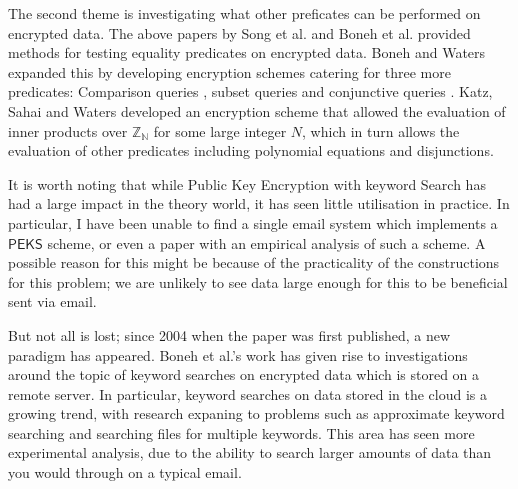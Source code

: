 \documentclass[a4paper,11pt]{article}
\begin{document}
    The second theme is investigating what other preficates can be performed on encrypted data. The above papers by Song et al. and Boneh et al. provided methods for testing equality predicates on encrypted data. Boneh and Waters\cite{boneh:predicate} expanded this by developing encryption schemes catering for three more predicates: Comparison queries , subset queries and conjunctive queries . Katz, Sahai and Waters\cite{katz:predicate} developed an encryption scheme that allowed the evaluation of inner products over $\mathbb{Z_N}$ for some large integer $N$, which in turn allows the evaluation of other predicates including polynomial equations and disjunctions.

    It is worth noting that while Public Key Encryption with keyword Search has had a large impact in the theory world, it has seen little utilisation in practice. In particular, I have been unable to find a single email system which implements a $\mathsf{PEKS}$ scheme, or even a paper with an empirical analysis of such a scheme. A possible reason for this might be because of the practicality of the constructions for this problem; we are unlikely to see data large enough for this to be beneficial sent via email.

    But not all is lost; since 2004 when the paper was first published, a new paradigm has appeared. Boneh et al.'s work has given rise to investigations around the topic of keyword searches on encrypted data which is stored on a remote server\cite{chang:remote}. In particular, keyword searches on data stored in the cloud is a growing trend, with research expaning to problems such as approximate keyword searching\cite{5462196} and searching files for multiple keywords\cite{6674958}. This area has seen more experimental analysis, due to the ability to search larger amounts of data than you would through on a typical email.

    \printbibliography
\end{document}
